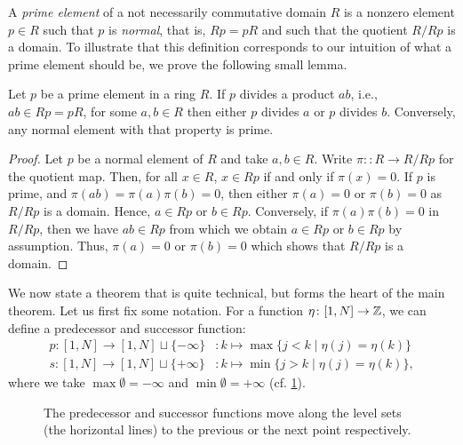 A \emph{prime element} of a not necessarily commutative domain $R$
is a nonzero element $p \in R$ such that $p$ is \emph{normal},
that is, $Rp = pR$ and such that the quotient $R / Rp$ is a domain. To illustrate that
this definition corresponds to our intuition of what a prime element should be, we
prove the following small lemma.
\begin{lemma}\label{lem:prime_divides_product}
	Let $p$ be a prime element in a ring $R$. If $p$ divides a product $ab$, i.e., $ab \in
		Rp = pR$, for some $a,b \in R$ then either $p$ divides $a$ or $p$ divides $b$.
	Conversely, any normal element with that property is prime.
\end{lemma}
\begin{proof}
	Let $p$ be a normal element of $R$ and take $a,b \in R$. Write $\pi : \colon R \to R /
		Rp$ for the quotient map. Then, for all $x \in R$, $x \in Rp$ if and only if $\pi(x) =
		0$. If $p$ is prime, and $\pi(ab) = \pi(a)\pi(b) = 0$, then either $\pi(a) = 0$ or
	$\pi(b) = 0$ as $R/Rp$ is a domain. Hence, $a \in Rp$ or $b \in Rp$. Conversely, if
	$\pi(a)\pi(b) = 0$ in $R/Rp$, then we have $ab \in Rp$ from which we obtain $a \in Rp$
	or $b \in Rp$ by assumption. Thus, $\pi(a) = 0$ or $\pi(b) = 0$ which shows that $R/
		Rp$ is a domain.
\end{proof}
%
We now state a theorem that is quite technical, but forms the heart of the main
theorem. Let us first fix some notation. For a function $\eta \colon [1, N] \to \mathbb{Z}$,
we can define a predecessor and successor
function:
\begin{align*}
	p \colon [1, N] \to [1, N] \sqcup \{-\infty\} & \colon k \mapsto  \max\{j < k \mid \eta(j) = \eta(k)\}  \\
	s \colon [1, N] \to [1, N] \sqcup \{+\infty\} & \colon k \mapsto  \min\{j > k \mid \eta(j) = \eta(k)\},
\end{align*}
%
where we take $\max \emptyset = - \infty$ and $\min \emptyset = + \infty$ (cf.
\cref{fig:predecessor_successor}).

\begin{figure}[h]
	\centering
	\caption{The predecessor and successor functions move along the level sets (the horizontal lines) to the previous or the next point respectively.}
	\label{fig:predecessor_successor}
\end{figure}

